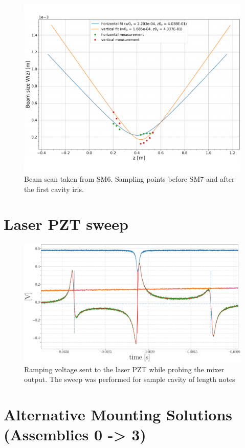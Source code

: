 \begin{figure}[H]
\includegraphics[width=.95\textwidth]{figs/ALGAAS/beam_scans/01_12_2021_postMMT.pdf}
\caption{Beam scan taken from SM6. Sampling points before SM7 and after the first cavity iris.}
\label{fig:beamscan2021}
\end{figure}

\section{Laser PZT sweep}

\begin{figure}[H]
	\includegraphics[width=.95\textwidth]{figs/ALGAAS/pdh_measured.pdf}
	\caption{Ramping voltage sent to the laser PZT while probing the mixer output. The sweep was performed for sample cavity of length notes}
\label{fig:pdhmeasured}
\end{figure}

\newpage

\section{Alternative Mounting Solutions (Assemblies 0 -> 3)}
